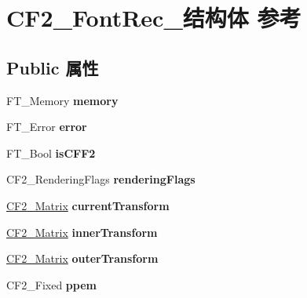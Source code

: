 \hypertarget{struct_c_f2___font_rec__}{}\section{C\+F2\+\_\+\+Font\+Rec\+\_\+结构体 参考}
\label{struct_c_f2___font_rec__}
\subsection*{Public 属性}
\begin{DoxyCompactItemize}
\item 
\mbox{\label{struct_c_f2___font_rec___a6ba5b92d6806189d0ac686951262abc2}} 
F\+T\+\_\+\+Memory {\bfseries memory}
\item 
\mbox{\label{struct_c_f2___font_rec___a78b08b3820b2f58bbd29dff52427b49d}} 
F\+T\+\_\+\+Error {\bfseries error}
\item 
\mbox{\label{struct_c_f2___font_rec___afa002fb17d2af067c116740bf532bee3}} 
F\+T\+\_\+\+Bool {\bfseries is\+C\+F\+F2}
\item 
\mbox{\label{struct_c_f2___font_rec___a5778703f256370f3b40aa2c582f8776f}} 
C\+F2\+\_\+\+Rendering\+Flags {\bfseries rendering\+Flags}
\item 
\mbox{\label{struct_c_f2___font_rec___ab0cf609e831a59973be1214c9ab463aa}} 
\hyperlink{struct_c_f2___matrix__}{C\+F2\+\_\+\+Matrix} {\bfseries current\+Transform}
\item 
\mbox{\label{struct_c_f2___font_rec___adb7ecff5226943a37a97e8595c583611}} 
\hyperlink{struct_c_f2___matrix__}{C\+F2\+\_\+\+Matrix} {\bfseries inner\+Transform}
\item 
\mbox{\label{struct_c_f2___font_rec___aafcf26a7817c5b87ec1bc9020c4cce60}} 
\hyperlink{struct_c_f2___matrix__}{C\+F2\+\_\+\+Matrix} {\bfseries outer\+Transform}
\item 
\mbox{\label{struct_c_f2___font_rec___a5e96a2c3531d538aab2d44af6e0eb17b}} 
C\+F2\+\_\+\+Fixed {\bfseries ppem}

\end{DoxyCompactItemize}

